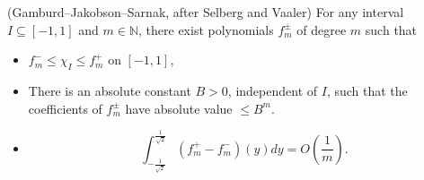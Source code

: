 \documentclass[AHL, Unicode, longabstracts, published]{cedram}
\newcommand{\N}{\mathbb{N}}
\begin{document}
\begin{lemm}\label{lem:gjs}
(Gamburd--Jakobson--Sarnak, after Selberg and Vaaler) For any interval $I \subseteq [-1,1]$ and $m \in \N$, there exist polynomials $f_{m}^{\pm}$ of degree $m$ such that
\begin{itemize}
\item $f_{m}^{-} \leq \chi_{I} \leq f_{m}^{+}$ on $[-1,1]$,
\item There is an absolute constant $B>0$, independent of $I$, such that the coefficients of $f_{m}^{\pm}$ have absolute value $\leq B^{m}$.
\item
\[
\int_{-\frac{1}{\sqrt{2}}}^{\frac{1}{\sqrt{2}}}(f_{m}^{+}-f_{m}^{-})(y)dy=O\left(\frac{1}{m}\right).
\]
\end{itemize}
\end{lemm}
\end{document}

